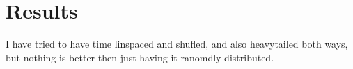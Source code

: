\chapter{Results}
\label{ch:results}

I have tried to have time linspaced and shufled, and also heavytailed both ways, but nothing is better then just having it ranomdly distributed. 